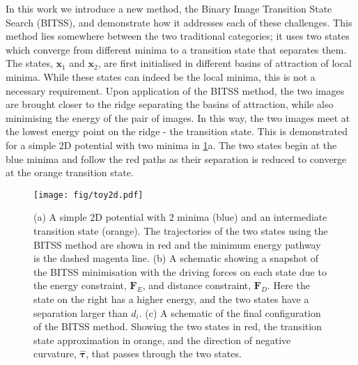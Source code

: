 \documentclass[aps,twocolumn]{revtex4}
\begin{document}
\topic In this work we introduce a new method, the Binary Image Transition State Search (BITSS), and demonstrate how it addresses each of these challenges.
This method lies somewhere between the two traditional categories; it uses two states which converge from different minima to a transition state that separates them.
The states, $\bm{x}_1$ and $\bm{x}_2$, are first initialised in different basins of attraction of local minima.
While these states can indeed be the local minima, this is not a necessary requirement.
Upon application of the BITSS method, the two images are brought closer to the ridge separating the basins of attraction, while also minimising the energy of the pair of images.
In this way, the two images meet at the lowest energy point on the ridge - the transition state.
This is demonstrated for a simple 2D potential with two minima in \cref{fig:toy2d}a.
The two states begin at the blue minima and follow the red paths as their separation is reduced to converge at the orange transition state.

\begin{figure}[htb]
  \centering
  \texttt{[image: fig/toy2d.pdf]}
  \caption{
    (a) A simple 2D potential with 2 minima (blue) and an intermediate transition state (orange).
        The trajectories of the two states using the BITSS method are shown in red and the minimum energy pathway is the dashed magenta line.
    (b) A schematic showing a snapshot of the BITSS minimisation with the driving forces on each state due to the energy constraint, $\bm{F}_E$, and distance constraint, $\bm{F}_D$.
        Here the state on the right has a higher energy, and the two states have a separation larger than $d_i$.
    (c) A schematic of the final configuration of the BITSS method.
        Showing the two states in red, the transition state approximation in orange, and the direction of negative curvature, $\bm{\hat{\tau}}$, that passes through the two states.
  }
  \label{fig:toy2d}
\end{figure}
\end{document}
